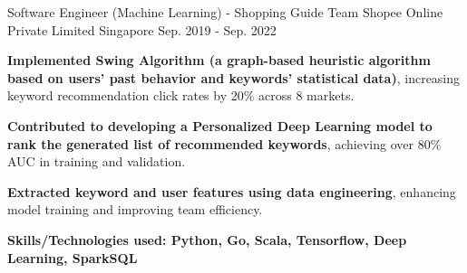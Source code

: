 \begin{cventries}
  \cventry
    {Software Engineer (Machine Learning) - Shopping Guide Team} %
    {Shopee Online Private Limited} %
    {Singapore} %
    {Sep. 2019 - Sep. 2022} %
    {
      \begin{cvitems}
        \item {\textbf{Implemented Swing Algorithm (a graph-based heuristic algorithm based on users' past behavior and keywords' statistical data)}, increasing keyword recommendation click rates by 20\% across 8 markets.}
        \item {\textbf{Contributed to developing a Personalized Deep Learning model to rank the generated list of recommended keywords}, achieving over 80\% AUC in training and validation.}
        \item {\textbf{Extracted keyword and user features using data engineering}, enhancing model training and improving team efficiency.}
      \end{cvitems}
    }
    {\textbf{Skills/Technologies used: Python, Go, Scala, Tensorflow, Deep Learning, SparkSQL}}

\end{cventries}
